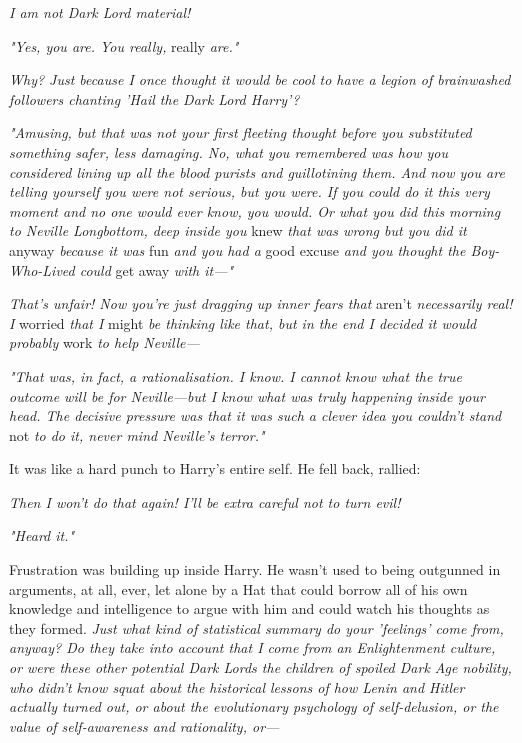 \emph{I am not Dark Lord material!}

\emph{"Yes, you are. You really,} really\emph{ are."}

\emph{Why? Just because I once thought it would be cool to have a legion of 
brainwashed followers chanting 'Hail the Dark Lord Harry'?}

\emph{"Amusing, but that was not your first fleeting thought before you 
substituted something safer, less damaging. No, what you remembered was how you 
considered lining up all the blood purists and guillotining them. And now you 
are telling yourself you were not serious, but you were. If you could do it 
this very moment and no one would ever know, you would. Or what you did this 
morning to Neville Longbottom, deep inside you} knew\emph{ that was wrong but 
you did it} anyway\emph{ because it was} fun\emph{ and you had a} good 
excuse\emph{ and you thought the Boy-Who-Lived could} get away\emph{ with 
it---"}

\emph{That's unfair! Now you're just dragging up inner fears that} aren't\emph{ 
necessarily real! I} worried\emph{ that I} might\emph{ be thinking like that, 
but in the end I decided it would probably} work\emph{ to help Neville---}

\emph{"That was, in fact, a rationalisation. I know. I cannot know what the 
true outcome will be for Neville---but I know what was truly happening inside 
your head. The decisive pressure was that it was such a clever idea you 
couldn't stand} not\emph{ to do it, never mind Neville's terror."}

It was like a hard punch to Harry's entire self. He fell back, rallied:

\emph{Then I won't do that again! I'll be extra careful not to turn evil!}

\emph{"Heard it."}

Frustration was building up inside Harry. He wasn't used to being outgunned in 
arguments, at all, ever, let alone by a Hat that could borrow all of his own 
knowledge and intelligence to argue with him and could watch his thoughts as 
they formed. \emph{Just what kind of statistical summary do your 'feelings' 
come from, anyway? Do they take into account that I come from an Enlightenment 
culture, or were these other potential Dark Lords the children of spoiled Dark 
Age nobility, who didn't know squat about the historical lessons of how Lenin 
and Hitler actually turned out, or about the evolutionary psychology of 
self-delusion, or the value of self-awareness and rationality, or---}

